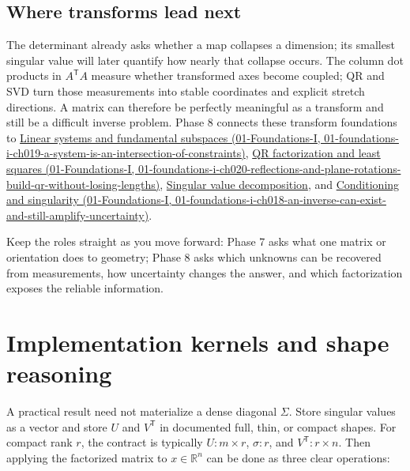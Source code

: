 \subsection{Where transforms lead next}\label{02-foundations-ii-ch038-where-transforms-lead-next}

The determinant already asks whether a map collapses a dimension; its smallest singular value will later quantify how nearly that collapse occurs. The column dot products in \(A^\mathsf T A\) measure whether transformed axes become coupled; QR and SVD turn those measurements into stable coordinates and explicit stretch directions. A matrix can therefore be perfectly meaningful as a transform and still be a difficult inverse problem. Phase 8 connects these transform foundations to \href{../01-Foundations-I/main.pdf\#nameddest=01-foundations-i-ch019-a-system-is-an-intersection-of-constraints}{Linear systems and fundamental subspaces (01-Foundations-I, 01-foundations-i-ch019-a-system-is-an-intersection-of-constraints)}, \href{../01-Foundations-I/main.pdf\#nameddest=01-foundations-i-ch020-reflections-and-plane-rotations-build-qr-without-losing-lengths}{QR factorization and least squares (01-Foundations-I, 01-foundations-i-ch020-reflections-and-plane-rotations-build-qr-without-losing-lengths)}, \hyperref[02-foundations-ii-ch024-full-thin-and-compact-shapes-for-tall-and-wide-matrices]{Singular value decomposition}, and \href{../01-Foundations-I/main.pdf\#nameddest=01-foundations-i-ch018-an-inverse-can-exist-and-still-amplify-uncertainty}{Conditioning and singularity (01-Foundations-I, 01-foundations-i-ch018-an-inverse-can-exist-and-still-amplify-uncertainty)}.

Keep the roles straight as you move forward: Phase 7 asks what one matrix or orientation does to geometry; Phase 8 asks which unknowns can be recovered from measurements, how uncertainty changes the answer, and which factorization exposes the reliable information.

\section{Implementation kernels and shape reasoning}\label{02-foundations-ii-ch038-implementation-kernels-and-shape-reasoning}

A practical result need not materialize a dense diagonal \(\Sigma\). Store singular values as a vector and store \(U\) and \(V^\mathsf T\) in documented full, thin, or compact shapes. For compact rank \(r\), the contract is typically \(U:m\times r\), \(\sigma:r\), and \(V^\mathsf T:r\times n\). Then applying the factorized matrix to \(x\in\mathbb R^n\) can be done as three clear operations:

